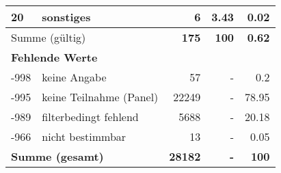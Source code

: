 \begin{longtable}{lXrrr}
     20 &
     \multicolumn{1}{X}{ sonstiges   } &


       \num{6} &
       \num[round-mode=places,round-precision=2]{3,43} &
         \num[round-mode=places,round-precision=2]{0,02} \\
     \midrule
     \multicolumn{2}{l}{Summe (gültig)} &
       \textbf{\num{175}} &
     \textbf{100} &
       \textbf{\num[round-mode=places,round-precision=2]{0,62}} \\
     \multicolumn{5}{l}{\textbf{Fehlende Werte}}\\
       -998 &
       keine Angabe &
         \num{57} &
        - &
         \num[round-mode=places,round-precision=2]{0,2} \\
       -995 &
       keine Teilnahme (Panel) &
         \num{22249} &
        - &
         \num[round-mode=places,round-precision=2]{78,95} \\
       -989 &
       filterbedingt fehlend &
         \num{5688} &
        - &
         \num[round-mode=places,round-precision=2]{20,18} \\
       -966 &
       nicht bestimmbar &
         \num{13} &
        - &
         \num[round-mode=places,round-precision=2]{0,05} \\
     \midrule
     \multicolumn{2}{l}{\textbf{Summe (gesamt)}} &
          \textbf{\num{28182}} &
        \textbf{-} &
        \textbf{100} \\
     \bottomrule
     \end{longtable}
     
